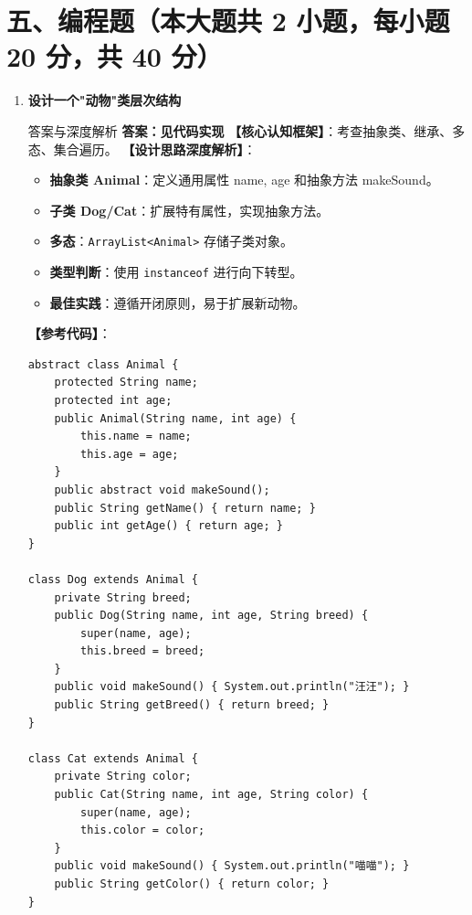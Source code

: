\documentclass[12pt, a4paper]{ctexart}
\newcommand{\code}[1]{\texttt{\color{myblue}#1}}
\begin{document}
\section*{五、编程题（本大题共 2 小题，每小题 20 分，共 40 分）}

\begin{enumerate}[label=\arabic*.]
	\item \textbf{设计一个"动物"类层次结构}
	      \begin{bluebox}{答案与深度解析}
		      \textbf{答案：见代码实现}
		      \textbf{【核心认知框架】}：考查抽象类、继承、多态、集合遍历。
		      \textbf{【设计思路深度解析】}：
		      \begin{itemize}[leftmargin=*, nosep]
			      \item \textbf{抽象类 Animal}：定义通用属性 name, age 和抽象方法 makeSound。
			      \item \textbf{子类 Dog/Cat}：扩展特有属性，实现抽象方法。
			      \item \textbf{多态}：\code{ArrayList<Animal>} 存储子类对象。
			      \item \textbf{类型判断}：使用 \code{instanceof} 进行向下转型。
			      \item \textbf{最佳实践}：遵循开闭原则，易于扩展新动物。
		      \end{itemize}
		      \textbf{【参考代码】}：
		      \begin{lstlisting}
abstract class Animal {
    protected String name;
    protected int age;
    public Animal(String name, int age) {
        this.name = name;
        this.age = age;
    }
    public abstract void makeSound();
    public String getName() { return name; }
    public int getAge() { return age; }
}

class Dog extends Animal {
    private String breed;
    public Dog(String name, int age, String breed) {
        super(name, age);
        this.breed = breed;
    }
    public void makeSound() { System.out.println("汪汪"); }
    public String getBreed() { return breed; }
}

class Cat extends Animal {
    private String color;
    public Cat(String name, int age, String color) {
        super(name, age);
        this.color = color;
    }
    public void makeSound() { System.out.println("喵喵"); }
    public String getColor() { return color; }
}


\end{lstlisting}
\end{bluebox}
\end{enumerate}
\end{document}
